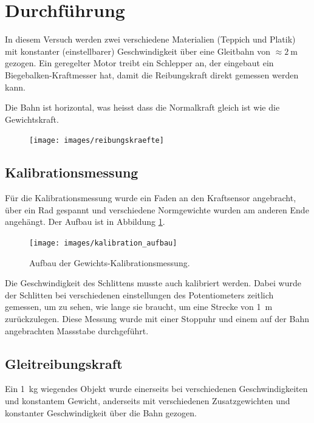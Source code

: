 \section{Durchf\"uhrung}

In  diesem Versuch werden zwei verschiedene Materialien (Teppich und Platik) mit
konstanter   (einstellbarer)   Geschwindigkeit   \"uber   eine   Gleitbahn   von
$\approx\SI{2}{\meter}$ gezogen.  Ein  geregelter Motor treibt ein Schlepper an,
der  eingebaut  ein  Biegebalken-Kraftmesser hat, damit die Reibungskraft direkt
gemessen werden kann.

Die Bahn ist horizontal, was heisst dass die  Normalkraft  gleich  ist  wie  die
Gewichtskraft.

\begin{figure}[H]
    \centering
    \texttt{[image: images/reibungskraefte]}
    \caption{}
\end{figure}


\subsection{Kalibrationsmessung}

F\"ur  die  Kalibrationsmessung wurde ein Faden an den  Kraftsensor  angebracht,
\"uber ein Rad gespannt und  verschiedene  Normgewichte  wurden  am anderen Ende
angeh\"angt.  Der  Aufbau   ist   in   Abbildung   \ref{fig:kalibration_aufbau}.

\begin{figure}[H]
    \centering
    \texttt{[image: images/kalibration\_aufbau]}
    \caption{Aufbau der Gewichts-Kalibrationsmessung.}
    \label{fig:kalibration_aufbau}
\end{figure}

Die  Geschwindigkeit  des  Schlittens musste auch kalibriert werden. Dabei wurde
der  Schlitten  bei  verschiedenen  einstellungen  des  Potentiometers  zeitlich
gemessen, um zu sehen, wie lange sie braucht, um eine Strecke von \SI{1}{\meter}
zur\"uckzulegen. Diese Messung wurde mit  einer  Stoppuhr und einem auf der Bahn
angebrachten Massstabe durchgef\"uhrt.


\subsection{Gleitreibungskraft}

Ein  \SI{1}{\kilo\gram}  wiegendes  Objekt  wurde  einerseits bei  verschiedenen
Geschwindigkeiten   und   konstantem  Gewicht,  anderseits   mit   verschiedenen
Zusatzgewichten  und  konstanter  Geschwindigkeit  \"uber  die   Bahn   gezogen.

